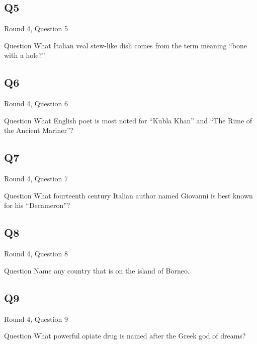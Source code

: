 \documentclass[11pt]{beamer}
\begin{document}
\subsection*{Q5}
\begin{frame}[t]{Round 4, Question 5}
\vspace{2em}
\begin{block}{Question}
What Italian veal stew-like dish comes from the term meaning ``bone with a hole?''
\end{block}
\end{frame}
    

\subsection*{Q6}
\begin{frame}[t]{Round 4, Question 6}
\vspace{2em}
\begin{block}{Question}
What English poet is most noted for ``Kubla Khan'' and ``The Rime of the Ancient Mariner''\@?
\end{block}
\end{frame}
    

\subsection*{Q7}
\begin{frame}[t]{Round 4, Question 7}
\vspace{2em}
\begin{block}{Question}
What fourteenth century Italian author named Giovanni is best known for his ``Decameron''\@?
\end{block}
\end{frame}
    

\subsection*{Q8}
\begin{frame}[t]{Round 4, Question 8}
\vspace{2em}
\begin{block}{Question}
Name any country that is on the island of Borneo.
\end{block}
\end{frame}
    

\subsection*{Q9}
\begin{frame}[t]{Round 4, Question 9}
\vspace{2em}
\begin{block}{Question}
What powerful opiate drug is named after the Greek god of dreams\@?
\end{block}
\end{frame}
    
\end{document}

